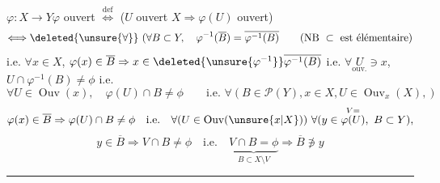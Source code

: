 $\varphi:X\longrightarrow Y$\qquad $\varphi$ ouvert $\overset{\mathrm{def}}\Longleftrightarrow$ ($U$ ouvert  $X\Rightarrow\varphi(U)$ ouvert)
\[
\Longleftrightarrow\deleted{\unsure{\forall}}\ (\forall B\subset Y,\quad\varphi^{-1}(\overline B)=\overline{\varphi^{-1}(B)}
\qquad(\text{NB }\subset\text{ est élémentaire})
\]
i.e. $\forall x\in X$, $\varphi(x)\in\overline B\Rightarrow x\in\deleted{\unsure{\varphi^{-1}}}\overline{\varphi^{-1}(B)}$
i.e. $\forall\underset{\mathrm{ouv.}}{U}\ni x$, $U\cap\varphi^{-1}(B)\ne\phi$ i.e.
\[
\forall U\in\operatorname{Ouv}(x),\quad\varphi(U)\cap B\ne\phi
\qquad\text{i.e. }\forall(B\in\mathcal P(Y),x\in X,U\in\operatorname{Ouv}_x(X),)
\]
\[
\varphi(x)\in\overline B\Rightarrow\varphi(U)\cap B\ne\phi\quad\text{i.e.}\quad
\forall(U\in\operatorname{Ouv}(\unsure{x|X}))\ \forall(y\in\overset{V=}{\varphi(U)},\ B\subset Y),
\]
\[
y\in\overline B\Rightarrow V\cap B\ne\phi\quad\text{i.e.}\quad
\underbrace{V\cap B=\phi}_{B\subset X\setminus V}\Rightarrow\overline B\not\ni y
\]

\par\noindent\rule{0.95\linewidth}{0.4pt}\par

